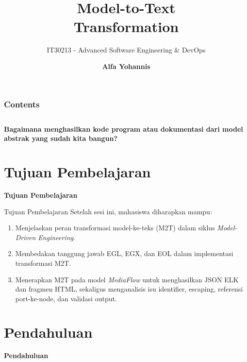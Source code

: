 \documentclass[aspectratio=169, table]{beamer}
\subtitle{IT30213 - Advanced Software Engineering \& DevOps}
\title{\Huge Model-to-Text\vspace{8pt}\\Transformation}
\author{\textbf{Alfa Yohannis}}
\begin{document}
\frame{\titlepage}

\begin{frame}[fragile]
	\frametitle{Contents}
	\vspace{20pt}
	\begin{columns}[t]
		\tableofcontents[sections={1-4}]

		\tableofcontents[sections={5-8}]
	\end{columns}
\end{frame}

\begin{frame}{\hfill}
	\centering
	\Huge{\textbf{Bagaimana menghasilkan kode program atau dokumentasi dari model abstrak yang sudah kita bangun?}}
\end{frame}

\section{Tujuan Pembelajaran}
\begin{frame}{\hfill}
	\centering
	\Huge{\textbf{Tujuan Pembelajaran}}
\end{frame}

\begin{frame}{Tujuan Pembelajaran}
\vspace{6pt}
Setelah sesi ini, mahasiswa diharapkan mampu:
\begin{enumerate}
  \item Menjelaskan peran transformasi model-ke-teks (M2T) dalam siklus \textit{Model-Driven Engineering}.
  \item Membedakan tanggung jawab EGL, EGX, dan EOL dalam implementasi transformasi M2T.
  \item Menerapkan M2T pada model \textit{MediaFlow} untuk menghasilkan JSON ELK dan fragmen HTML, sekaligus menganalisis isu identifier, escaping, referensi port-ke-node, dan validasi output.
\end{enumerate}
\end{frame}

\section{Pendahuluan}
\begin{frame}{\hfill}
	\centering
	\Huge{\textbf{Pendahuluan}}
\end{frame}
\end{document}
